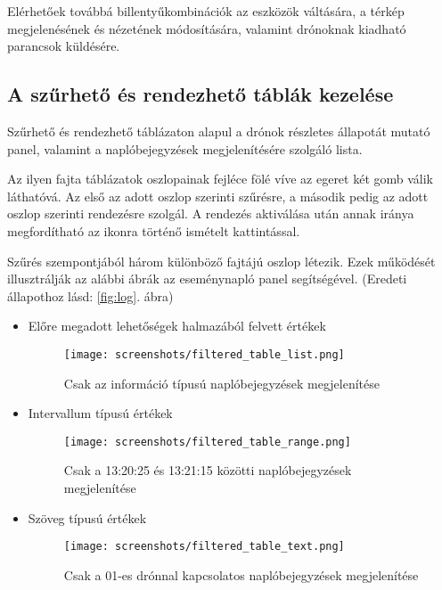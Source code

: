 Elérhetőek továbbá billentyűkombinációk az eszközök váltására, a térkép
megjelenésének és nézetének módosítására, valamint drónoknak kiadható parancsok
küldésére.

\newpage

\subsection{A szűrhető és rendezhető táblák kezelése}
\label{filterable_sortable_table}

Szűrhető és rendezhető táblázaton alapul a drónok részletes állapotát mutató
panel, valamint a naplóbejegyzések megjelenítésére szolgáló lista.

Az ilyen fajta táblázatok oszlopainak fejléce fölé víve az egeret két gomb válik
láthatóvá. Az első az adott oszlop szerinti szűrésre, a második pedig az adott
oszlop szerinti rendezésre szolgál. A rendezés aktiválása után annak iránya
megfordítható az ikonra történő ismételt kattintással.

Szűrés szempontjából három különböző fajtájú oszlop létezik.
Ezek működését illusztrálják az alábbi ábrák az eseménynapló panel segítségével.
(Eredeti állapothoz lásd: \ref{fig:log}. ábra)

\begin{itemize}
  \item Előre megadott lehetőségek halmazából felvett értékek
  \begin{figure}[H]

    \texttt{[image: screenshots/filtered\_table\_list.png]}
    \caption{Csak az információ típusú naplóbejegyzések megjelenítése}
    \label{fig:filtered_table_list}
  \end{figure}

  \item Intervallum típusú értékek
  \begin{figure}[H]

    \texttt{[image: screenshots/filtered\_table\_range.png]}
    \caption{Csak a 13:20:25 és 13:21:15 közötti naplóbejegyzések megjelenítése}
    \label{fig:filtered_table_range}
  \end{figure}

  \item Szöveg típusú értékek
  \begin{figure}[H]

    \texttt{[image: screenshots/filtered\_table\_text.png]}
    \caption{Csak a 01-es drónnal kapcsolatos naplóbejegyzések megjelenítése}
    \label{fig:filtered_table_text}
  \end{figure}
\end{itemize}


